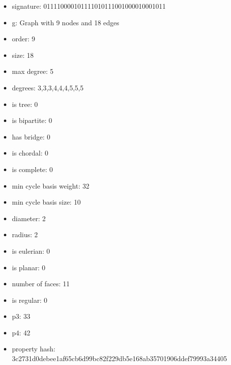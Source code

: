 \newpage
\begin{figure}
\end{figure}
\begin{itemize}
\item signature: 011110000101111010111001000010001011
\item g: Graph with 9 nodes and 18 edges
\item order: 9
\item size: 18
\item max degree: 5
\item degrees: 3,3,3,4,4,4,5,5,5
\item is tree: 0
\item is bipartite: 0
\item has bridge: 0
\item is chordal: 0
\item is complete: 0
\item min cycle basis weight: 32
\item min cycle basis size: 10
\item diameter: 2
\item radius: 2
\item is eulerian: 0
\item is planar: 0
\item number of faces: 11
\item is regular: 0
\item p3: 33
\item p4: 42
\item property hash: 3c2731d0debee1af65cb6d99bc82f229db5e168ab35701906ddef79993a34405
\end{itemize}
